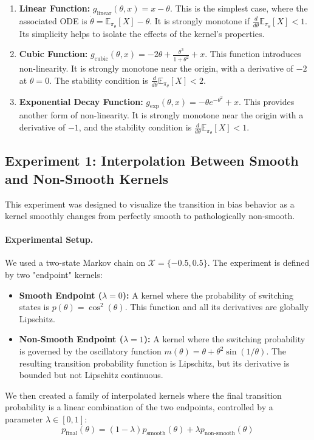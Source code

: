 \documentclass[a4paper]{article}
\begin{document}
\begin{enumerate}
	\item \textbf{Linear Function:} \(g_{\text{linear}}(\theta, x) = x - \theta\). This is the simplest case, where the associated ODE is \(\dot{\theta} = \mathbb{E}_{\pi_\theta}[X] - \theta\). It is strongly monotone if \(\frac{d}{d\theta}\mathbb{E}_{\pi_\theta}[X] < 1\). Its simplicity helps to isolate the effects of the kernel's properties.
	
	\item \textbf{Cubic Function:} \(g_{\text{cubic}}(\theta, x) = -2\theta + \frac{\theta^3}{1+\theta^2} + x\). This function introduces non-linearity. It is strongly monotone near the origin, with a derivative of \(-2\) at \(\theta=0\). The stability condition is \(\frac{d}{d\theta}\mathbb{E}_{\pi_\theta}[X] < 2\).
	
	\item \textbf{Exponential Decay Function:} \(g_{\text{exp}}(\theta, x) = -\theta e^{-\theta^2} + x\). This provides another form of non-linearity. It is strongly monotone near the origin with a derivative of \(-1\), and the stability condition is \(\frac{d}{d\theta}\mathbb{E}_{\pi_\theta}[X] < 1\).
\end{enumerate}

\subsection*{Experiment 1: Interpolation Between Smooth and Non-Smooth Kernels}
This experiment was designed to visualize the transition in bias behavior as a kernel smoothly changes from perfectly smooth to pathologically non-smooth.

\paragraph{Experimental Setup.} We used a two-state Markov chain on \(\mathcal{X}=\{-0.5, 0.5\}\). The experiment is defined by two "endpoint" kernels:
\begin{itemize}
	\item \textbf{Smooth Endpoint (\(\lambda=0\)):} A kernel where the probability of switching states is \(p(\theta) = \cos^2(\theta)\). This function and all its derivatives are globally Lipschitz.
	\item \textbf{Non-Smooth Endpoint (\(\lambda=1\)):} A kernel where the switching probability is governed by the oscillatory function \(m(\theta) = \theta + \theta^2\sin(1/\theta)\). The resulting transition probability function is Lipschitz, but its derivative is bounded but not Lipschitz continuous.
\end{itemize}
We then created a family of interpolated kernels where the final transition probability is a linear combination of the two endpoints, controlled by a parameter \(\lambda \in [0,1]\):
\[ p_{\text{final}}(\theta) = (1-\lambda)p_{\text{smooth}}(\theta) + \lambda p_{\text{non-smooth}}(\theta) \]
\end{document}
